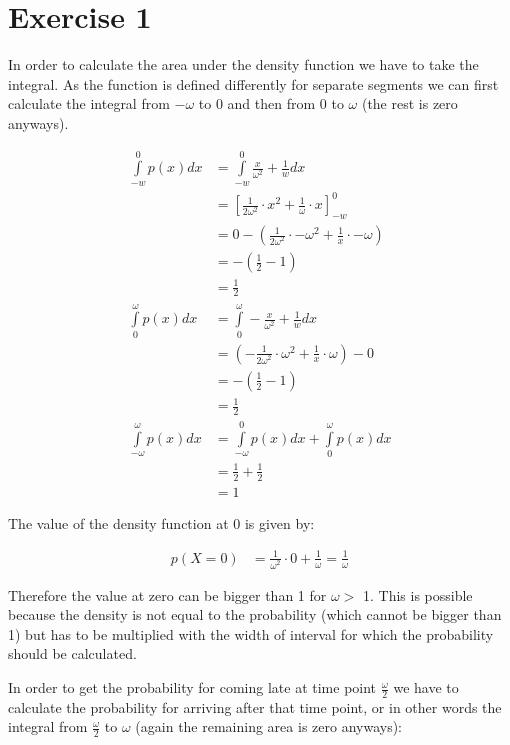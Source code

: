\def \TutorialSheetNumber{4}



\section*{Exercise 1}
In order to calculate the area under the density function we have to take the integral. As the function is defined differently for separate segments we can first calculate the integral from $-\omega$ to 0 and then from 0 to $\omega$ (the rest is zero anyways).

\begin{align*}
\int \limits_{-w}^{0}p(x) dx & = \int \limits_{-w}^{0} \frac{x}{\omega^2} + \frac{1}{w} dx \\
& =     \left[\frac{1}{2\omega ^2} \cdot x^2 + \frac{1}{\omega } \cdot x \right]_{-w}^{0} \\
& = 0 - \left(\frac{1}{2\omega ^2} \cdot - \omega^2 + \frac{1}{x} \cdot -\omega \right) \\
& = -\left(\frac{1}{2} - 1\right) \\
& = \frac{1}{2}\\
\int \limits_{0}^{\omega}p(x) dx & = \int \limits_{0}^{\omega} -\frac{x}{\omega^2} + \frac{1}{w} dx \\
& = \left(-\frac{1}{2\omega ^2} \cdot \omega^2 + \frac{1}{x} \cdot \omega\right) - 0 \\
& = -\left(\frac{1}{2} - 1\right) \\
& = \frac{1}{2}\\
\int \limits_{-\omega}^{\omega}p(x) dx & = \int \limits_{-\omega}^{0}p(x) dx +\int \limits_{0}^{\omega}p(x) dx \\
& = \frac{1}{2} + \frac{1}{2} \\
& = 1
\end{align*}

The value of the density function at 0 is given by:

\begin{align*}
p(X=0) & = \frac{1}{\omega^2} \cdot 0 + \frac{1}{\omega} = \frac{1}{\omega}
\end{align*}

Therefore the value at zero can be bigger than 1 for $\omega >$ 1. This is possible because the density is not equal to the probability (which cannot be bigger than 1) but has to be multiplied with the width of interval for which the probability should be calculated.

In order to get the probability for coming late at time point $\frac{\omega}{2}$ we have to calculate the probability for arriving after that time point, or in other words the integral from $\frac{\omega}{2}$ to $\omega$ (again the remaining area is zero anyways):

